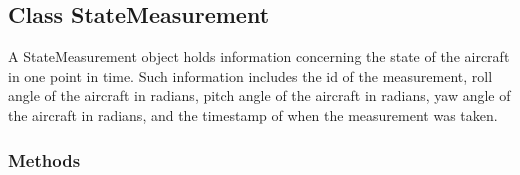 

\subsection{Class StateMeasurement}

    \label{client_rest:StateMeasurement}
A StateMeasurement object holds information concerning the state of the 
aircraft in one point in time. Such information includes the id of the 
measurement, roll angle of the aircraft in radians, pitch angle of the 
aircraft in radians, yaw angle of the aircraft in radians, and the 
timestamp of when the measurement was taken.



  \subsubsection{Methods}

    \label{client_rest:StateMeasurement:__init__}

    \vspace{0.5ex}

